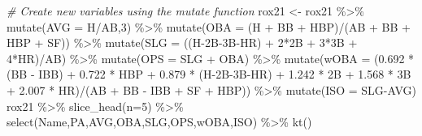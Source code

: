 \documentclass[
  11pt,
]{book}
\newenvironment{Shaded}{\begin{snugshade}}{\end{snugshade}}
\newcommand{\AttributeTok}[1]{\textcolor[rgb]{0.77,0.63,0.00}{#1}}
\newcommand{\CommentTok}[1]{\textcolor[rgb]{0.56,0.35,0.01}{\textit{#1}}}
\newcommand{\DecValTok}[1]{\textcolor[rgb]{0.00,0.00,0.81}{#1}}
\newcommand{\FloatTok}[1]{\textcolor[rgb]{0.00,0.00,0.81}{#1}}
\newcommand{\FunctionTok}[1]{\textcolor[rgb]{0.00,0.00,0.00}{#1}}
\newcommand{\NormalTok}[1]{#1}
\newcommand{\OtherTok}[1]{\textcolor[rgb]{0.56,0.35,0.01}{#1}}
\newcommand{\SpecialCharTok}[1]{\textcolor[rgb]{0.00,0.00,0.00}{#1}}
\newcommand{\StringTok}[1]{\textcolor[rgb]{0.31,0.60,0.02}{#1}}
\theoremstyle{definition}
\theoremstyle{definition}
\theoremstyle{definition}
\theoremstyle{definition}
\theoremstyle{remark}
\begin{document}
\begin{Shaded}
\begin{Highlighting}[]
\CommentTok{\# Create new variables using the mutate function}
\NormalTok{rox21 }\OtherTok{\textless{}{-}}\NormalTok{ rox21 }\SpecialCharTok{\%\textgreater{}\%} 
  \FunctionTok{mutate}\NormalTok{(}\AttributeTok{AVG =}\NormalTok{ H}\SpecialCharTok{/}\NormalTok{AB,}\DecValTok{3}\NormalTok{) }\SpecialCharTok{\%\textgreater{}\%}
  \FunctionTok{mutate}\NormalTok{(}\AttributeTok{OBA =}\NormalTok{ (H }\SpecialCharTok{+}\NormalTok{ BB }\SpecialCharTok{+}\NormalTok{ HBP)}\SpecialCharTok{/}\NormalTok{(AB }\SpecialCharTok{+}\NormalTok{ BB }\SpecialCharTok{+}\NormalTok{ HBP }\SpecialCharTok{+}\NormalTok{ SF)) }\SpecialCharTok{\%\textgreater{}\%}
  \FunctionTok{mutate}\NormalTok{(}\AttributeTok{SLG =}\NormalTok{ ((H}\SpecialCharTok{{-}}\StringTok{\textasciigrave{}}\AttributeTok{2B}\StringTok{\textasciigrave{}}\SpecialCharTok{{-}}\StringTok{\textasciigrave{}}\AttributeTok{3B}\StringTok{\textasciigrave{}}\SpecialCharTok{{-}}\NormalTok{HR) }\SpecialCharTok{+} \DecValTok{2}\SpecialCharTok{*}\StringTok{\textasciigrave{}}\AttributeTok{2B}\StringTok{\textasciigrave{}} \SpecialCharTok{+} \DecValTok{3}\SpecialCharTok{*}\StringTok{\textasciigrave{}}\AttributeTok{3B}\StringTok{\textasciigrave{}} \SpecialCharTok{+} \DecValTok{4}\SpecialCharTok{*}\NormalTok{HR)}\SpecialCharTok{/}\NormalTok{AB) }\SpecialCharTok{\%\textgreater{}\%}
  \FunctionTok{mutate}\NormalTok{(}\AttributeTok{OPS =}\NormalTok{ SLG }\SpecialCharTok{+}\NormalTok{ OBA) }\SpecialCharTok{\%\textgreater{}\%}
  \FunctionTok{mutate}\NormalTok{(}\AttributeTok{wOBA =}\NormalTok{ (}\FloatTok{0.692} \SpecialCharTok{*}\NormalTok{ (BB }\SpecialCharTok{{-}}\NormalTok{ IBB) }\SpecialCharTok{+} \FloatTok{0.722} \SpecialCharTok{*}\NormalTok{ HBP }\SpecialCharTok{+} \FloatTok{0.879} \SpecialCharTok{*}\NormalTok{ (H}\SpecialCharTok{{-}}\StringTok{\textasciigrave{}}\AttributeTok{2B}\StringTok{\textasciigrave{}}\SpecialCharTok{{-}}\StringTok{\textasciigrave{}}\AttributeTok{3B}\StringTok{\textasciigrave{}}\SpecialCharTok{{-}}\NormalTok{HR) }\SpecialCharTok{+} \FloatTok{1.242} \SpecialCharTok{*} \StringTok{\textasciigrave{}}\AttributeTok{2B}\StringTok{\textasciigrave{}} \SpecialCharTok{+} \FloatTok{1.568} \SpecialCharTok{*} \StringTok{\textasciigrave{}}\AttributeTok{3B}\StringTok{\textasciigrave{}} \SpecialCharTok{+} \FloatTok{2.007} \SpecialCharTok{*}\NormalTok{ HR)}\SpecialCharTok{/}\NormalTok{(AB }\SpecialCharTok{+}\NormalTok{ BB }\SpecialCharTok{{-}}\NormalTok{ IBB }\SpecialCharTok{+}\NormalTok{ SF }\SpecialCharTok{+}\NormalTok{ HBP)) }\SpecialCharTok{\%\textgreater{}\%}
  \FunctionTok{mutate}\NormalTok{(}\AttributeTok{ISO =}\NormalTok{ SLG}\SpecialCharTok{{-}}\NormalTok{AVG)}
\NormalTok{rox21 }\SpecialCharTok{\%\textgreater{}\%} \FunctionTok{slice\_head}\NormalTok{(}\AttributeTok{n=}\DecValTok{5}\NormalTok{) }\SpecialCharTok{\%\textgreater{}\%} \FunctionTok{select}\NormalTok{(Name,PA,AVG,OBA,SLG,OPS,wOBA,ISO) }\SpecialCharTok{\%\textgreater{}\%} \FunctionTok{kt}\NormalTok{()}
\end{Highlighting}
\end{Shaded}
\end{document}
